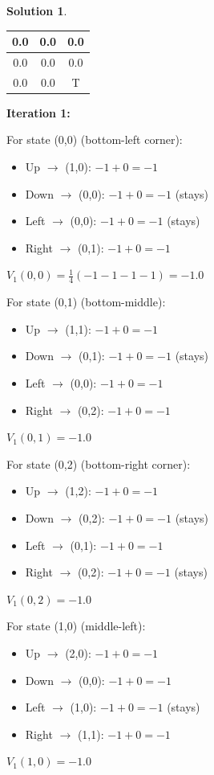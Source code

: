 \documentclass[11pt]{article}
\theoremstyle{definition}
\newtheorem*{solution}{Solution}
\begin{document}
\begin{solution}
\begin{center}
\begin{tabular}{|c|c|c|}
\hline
0.0 & 0.0 & 0.0 \\
\hline
0.0 & 0.0 & 0.0 \\
\hline
0.0 & 0.0 & T \\
\hline
\end{tabular}
\end{center}

\textbf{Iteration 1:}

For state (0,0) (bottom-left corner):
\begin{itemize}
    \item Up $\to$ (1,0): $-1 + 0 = -1$
    \item Down $\to$ (0,0): $-1 + 0 = -1$ (stays)
    \item Left $\to$ (0,0): $-1 + 0 = -1$ (stays)
    \item Right $\to$ (0,1): $-1 + 0 = -1$
\end{itemize}
$V_1(0,0) = \frac{1}{4}(-1 - 1 - 1 - 1) = -1.0$

For state (0,1) (bottom-middle):
\begin{itemize}
    \item Up $\to$ (1,1): $-1 + 0 = -1$
    \item Down $\to$ (0,1): $-1 + 0 = -1$ (stays)
    \item Left $\to$ (0,0): $-1 + 0 = -1$
    \item Right $\to$ (0,2): $-1 + 0 = -1$
\end{itemize}
$V_1(0,1) = -1.0$

For state (0,2) (bottom-right corner):
\begin{itemize}
    \item Up $\to$ (1,2): $-1 + 0 = -1$
    \item Down $\to$ (0,2): $-1 + 0 = -1$ (stays)
    \item Left $\to$ (0,1): $-1 + 0 = -1$
    \item Right $\to$ (0,2): $-1 + 0 = -1$ (stays)
\end{itemize}
$V_1(0,2) = -1.0$

For state (1,0) (middle-left):
\begin{itemize}
    \item Up $\to$ (2,0): $-1 + 0 = -1$
    \item Down $\to$ (0,0): $-1 + 0 = -1$
    \item Left $\to$ (1,0): $-1 + 0 = -1$ (stays)
    \item Right $\to$ (1,1): $-1 + 0 = -1$
\end{itemize}
$V_1(1,0) = -1.0$


\end{solution}
\end{document}
